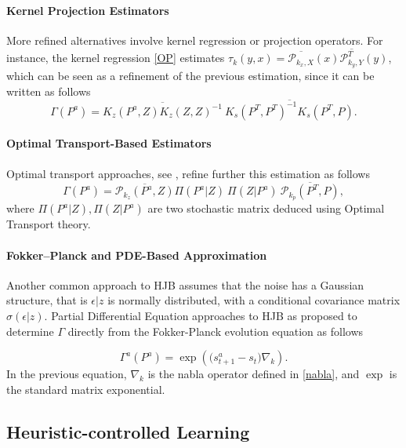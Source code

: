 \documentclass[
]{article}
\numberwithin{equation}{section}
\begin{document}
\paragraph*{Kernel Projection Estimators} More refined alternatives involve kernel regression or projection operators. For instance, the kernel regression \eqref{OP} estimates $\tau_k(y,x) = \overline{\mathcal{P}_{k_x,X}}(x)\overline{\mathcal{P}_{k_y,Y}^T}(y)$, which can be seen as a refinement of the previous estimation, since it can be written as follows
\begin{equation} \label{cond}
\Gamma(P^a) = \overline{K_z(P^a,Z)K_z(Z,Z)^{-1}} \  \overline{K_s(P^T,P^T)^{-1} K_s(P^T,P)}.
\end{equation}


\paragraph*{Optimal Transport-Based Estimators} Optimal transport approaches, see \cite{LeMeMi:2024}, refine further this estimation as follows
\begin{equation}
\Gamma(P^a) = \overline{\mathcal{P}_{k_z}(P^a,Z)} \Pi(P^a|Z) \ \Pi( Z | P^a) \  \overline{\mathcal{P}_{k_p}(P^T,P)} ,
\end{equation}
where $\Pi(P^a|Z), \Pi( Z | P^a)$ are two stochastic matrix deduced using Optimal Transport theory.  

\paragraph*{Fokker–Planck and PDE-Based Approximation} Another common approach to HJB assumes that the noise has a Gaussian structure, that is $\epsilon | z$ is normally distributed, with a conditional covariance matrix $\sigma(\epsilon | z)$. Partial Differential Equation approaches to HJB 
as \cite{LeMe:2017} proposed to determine $\Gamma$ directly from the Fokker-Planck evolution equation as follows

\begin{equation} \label{toto}
	\Gamma^a(P^a) = \exp( \big(s_{t+1}^a-s_t \big) \nabla_k).
\end{equation}
In the previous equation, $\nabla_k$ is the nabla operator defined in \ref{nabla}, and $\exp$ is the standard matrix exponential.


\hypertarget{Heuristic-controlled Learning}{%
\subsection{Heuristic-controlled Learning}\label{Heuristic-controlled Learning}}
\end{document}
